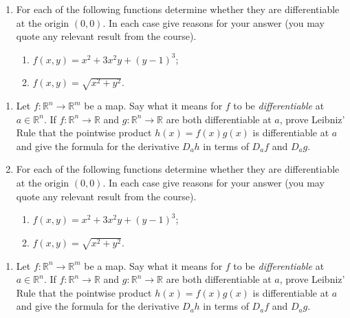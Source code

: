 \documentclass{exams}
\newcommand{\R}{\mathbb{R}}
\begin{document}
\begin{examcomp1}
\begin{question}
\begin{enumerate}
\item For each of the following functions determine whether they are
differentiable at the origin $(0,0)$. In each case give reasons for your
answer (you may quote any relevant result from the course).

\begin{enumerate}
\item $f(x,y) = x^2 + 3x^2y + (y-1)^3$;
\item $f(x,y) = \sqrt{x^2+y^2}$.
\end{enumerate}
\end{enumerate}
\end{question}


\begin{question}
\begin{enumerate}
\item Let $f \colon \R^n \to \R^m$ be a map. Say what it means for $f$ to be
\textit{differentiable} at $a \in \R^n$. If $f \colon \R^n \to \R$ and
$g \colon \R^n \to \R$ are both differentiable at $a$, prove Leibniz'
Rule that the pointwise product $h(x) = f(x)g(x)$ is differentiable at
$a$ and give the formula for the derivative $D_ah$ in terms of $D_af$
and $D_ag$.

\item For each of the following functions determine whether they are
differentiable at the origin $(0,0)$. In each case give reasons for your
answer (you may quote any relevant result from the course).

\begin{enumerate}
\item $f(x,y) = x^2 + 3x^2y + (y-1)^3$;
\item $f(x,y) = \sqrt{x^2+y^2}$.
\end{enumerate}
\end{enumerate}
\end{question}

\newpage

\begin{question}
\begin{enumerate}
\item Let $f \colon \R^n \to \R^m$ be a map. Say what it means for $f$ to be
\textit{differentiable} at $a \in \R^n$. If $f \colon \R^n \to \R$ and
$g \colon \R^n \to \R$ are both differentiable at $a$, prove Leibniz'
Rule that the pointwise product $h(x) = f(x)g(x)$ is differentiable at
$a$ and give the formula for the derivative $D_ah$ in terms of $D_af$
and $D_ag$.


\end{enumerate}
\end{question}
\end{examcomp1}
\end{document}
